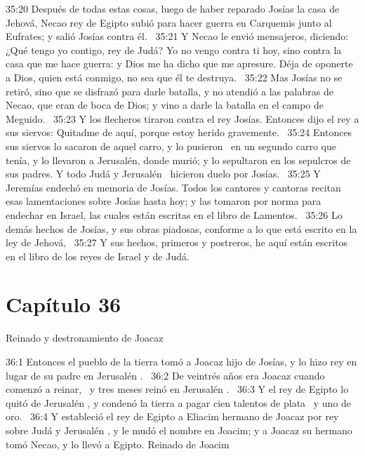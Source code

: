 																																			35:20 Después de todas estas cosas, luego de haber reparado Josías la casa de Jehová, Necao rey de Egipto subió para hacer guerra en Carquemis junto al Eufrates; y salió Josías contra él.  
																																			35:21 Y Necao le envió mensajeros, diciendo: ¿Qué tengo yo contigo, rey de Judá? Yo no vengo contra ti hoy, sino contra la casa que me hace guerra: y Dios me ha dicho que me apresure. Déja de oponerte a Dios, quien está conmigo, no sea que él te destruya.  
																																			35:22 Mas Josías no se retiró, sino que se disfrazó para darle batalla, y no atendió a las palabras de Necao, que eran de boca de Dios; y vino a darle la batalla en el campo de Meguido.  
																																			35:23 Y los flecheros tiraron contra el rey Josías. Entonces dijo el rey a sus siervos: Quitadme de aquí, porque estoy herido gravemente.  
																																			35:24 Entonces sus siervos lo sacaron de aquel carro, y lo pusieron  en un segundo carro que tenía, y lo llevaron a Jerusalén, donde murió; y lo sepultaron en los sepulcros de sus padres. Y todo Judá y Jerusalén  hicieron duelo por Josías.  
																																			35:25 Y Jeremías endechó en memoria de Josías. Todos los cantores y cantoras recitan esas lamentaciones sobre Josías hasta hoy; y las tomaron por norma para endechar en Israel, las cuales están escritas en el libro de Lamentos.  
																																			35:26 Lo demás hechos de Josías, y sus obras piadosas, conforme a lo que está escrito en la ley de Jehová,  
																																			35:27 Y sus hechos, primeros y postreros, he aquí están escritos en el libro de los reyes de Israel y de Judá.  
																																			\section*{Capítulo 36}
																																				Reinado y destronamiento de Joacaz 
																																				
																																				
																																				36:1 Entonces el pueblo de la tierra tomó a Joacaz hijo de Josías, y lo hizo rey en lugar de su padre en Jerusalén .  
																																				36:2 De veintrés años era Joacaz cuando comenzó a reinar,  y tres meses reinó en Jerusalén .  
																																				36:3 Y el rey de Egipto lo quitó de Jerusalén , y condenó la tierra a pagar cien talentos de plata  y uno de oro.  
																																				36:4 Y estableció el rey de Egipto a Eliacim hermano de Joacaz por rey sobre Judá y Jerusalén , y le mudó el nombre en Joacim; y a Joacaz su hermano tomó Necao, y lo llevó a Egipto. 
																																				Reinado de Joacim 
																																				
